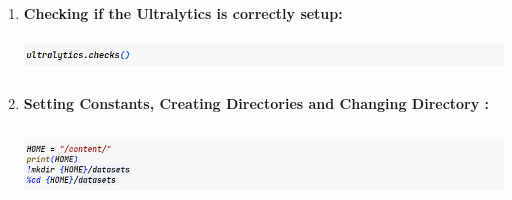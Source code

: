 \documentclass[12 pt]{report}
\begin{document}
{\begin{enumerate}
    \item \textbf{Checking if the Ultralytics is correctly setup:}
          \begin{center}
            \includegraphics[width=17cm, height=1cm]{check ultralatics.png}
          \end{center}

    \item \textbf{Setting Constants, Creating Directories and Changing Directory :}
          \begin{center}
            \includegraphics[width=17cm, height=2cm]{creating home and dataset folder.png}
          \end{center}
  \end{enumerate}
 }
\end{document}
